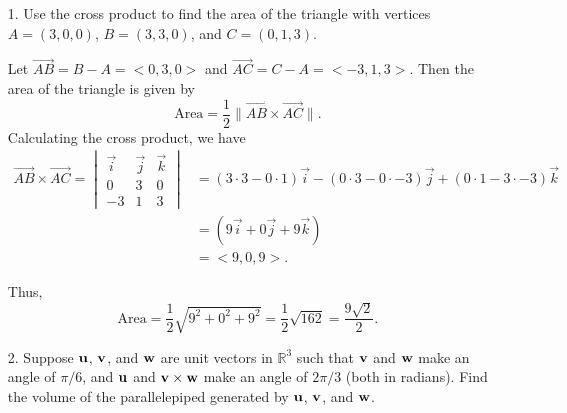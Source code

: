 \documentclass[reqno, 12pt]{amsart}
\newcommand{\R}{\mathbb R}
\begin{document}
\newpage
\begin{itemize}
    \item[1.] Use the cross product to find the area of the triangle with vertices $A = (3,0,0)$, $B = (3,3,0)$, and $C = (0,1,3)$.
          \newline

          Let $\vec{AB} = B - A = <0,3,0>$ and $\vec{AC} = C - A = <-3,1,3>$. Then the area of the triangle is given by
          \[
              \text{Area} = \frac{1}{2} \| \vec{AB} \times \vec{AC} \|.
          \]
          Calculating the cross product, we have
          \begin{align*}
              \vec{AB} \times \vec{AC} = \begin{vmatrix}
                                             \vec{i} & \vec{j} & \vec{k} \\
                                             0       & 3       & 0       \\
                                             -3      & 1       & 3
                                         \end{vmatrix} & = (3 \cdot 3 - 0 \cdot 1)\vec{i} - (0 \cdot 3 - 0 \cdot -3)\vec{j} + (0 \cdot 1 - 3 \cdot -3)\vec{k} \\
                                                         & = (9\vec{i} + 0\vec{j} + 9\vec{k})                                                                 \\
                                                         & = <9,0,9>.
          \end{align*}

          Thus,
          \[
              \text{Area} = \frac{1}{2} \sqrt{9^2 + 0^2 + 9^2} = \frac{1}{2} \sqrt{162} = \frac{9\sqrt{2}}{2}.
          \]

          \vspace{0.5 in}

    \item[2.] Suppose ${\bf u}$, ${\bf v}$, and ${\bf w}$ are unit vectors in $\R^3$ such that ${\bf v}$ and ${\bf w}$ make an angle of $\pi/6$, and ${\bf u}$ and ${\bf v}\times{\bf w}$ make an angle of $2\pi/3$ (both in radians). Find the volume of the parallelepiped generated by ${\bf u}$, ${\bf v}$, and ${\bf w}$.
          \newline


\end{itemize}
\end{document}
